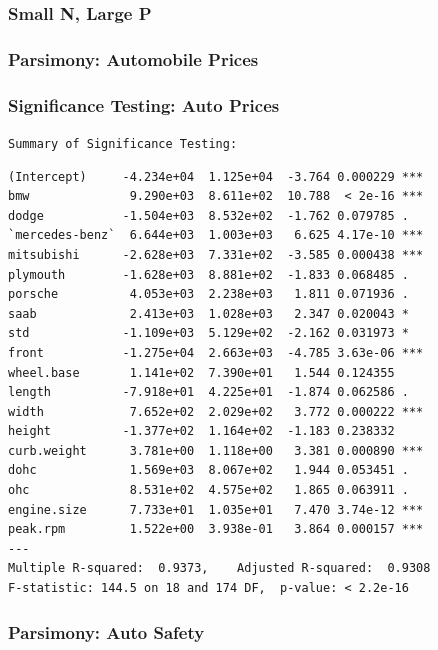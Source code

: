 \documentclass{beamer}
\begin{document}

\author[John Chen]{C. Patton, A. Rumbaugh, T. Provan, O. Prilepova, J. Chen}
\begin{frame}
\frametitle{Small N, Large P}
\end{frame}

\begin{frame}
\frametitle{Parsimony: Automobile Prices}
\end{frame}

\begin{frame}[fragile]
\frametitle{Significance Testing: Auto Prices}
\texttt{Summary of Significance Testing:}\\
\tiny{ 
\begin{verbatim}
(Intercept)     -4.234e+04  1.125e+04  -3.764 0.000229 ***
bmw              9.290e+03  8.611e+02  10.788  < 2e-16 ***
dodge           -1.504e+03  8.532e+02  -1.762 0.079785 .  
`mercedes-benz`  6.644e+03  1.003e+03   6.625 4.17e-10 ***
mitsubishi      -2.628e+03  7.331e+02  -3.585 0.000438 ***
plymouth        -1.628e+03  8.881e+02  -1.833 0.068485 .  
porsche          4.053e+03  2.238e+03   1.811 0.071936 .  
saab             2.413e+03  1.028e+03   2.347 0.020043 *  
std             -1.109e+03  5.129e+02  -2.162 0.031973 *  
front           -1.275e+04  2.663e+03  -4.785 3.63e-06 ***
wheel.base       1.141e+02  7.390e+01   1.544 0.124355    
length          -7.918e+01  4.225e+01  -1.874 0.062586 .  
width            7.652e+02  2.029e+02   3.772 0.000222 ***
height          -1.377e+02  1.164e+02  -1.183 0.238332    
curb.weight      3.781e+00  1.118e+00   3.381 0.000890 ***
dohc             1.569e+03  8.067e+02   1.944 0.053451 .  
ohc              8.531e+02  4.575e+02   1.865 0.063911 .  
engine.size      7.733e+01  1.035e+01   7.470 3.74e-12 ***
peak.rpm         1.522e+00  3.938e-01   3.864 0.000157 ***
---
Multiple R-squared:  0.9373,	Adjusted R-squared:  0.9308 
F-statistic: 144.5 on 18 and 174 DF,  p-value: < 2.2e-16  
\end{verbatim}
}
\end{frame}

\begin{frame}
\frametitle{Parsimony: Auto Safety}
\end{frame}
\end{document}
